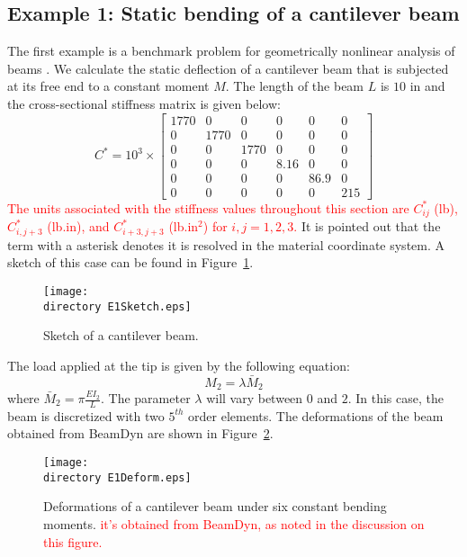 \subsection{Example 1: Static bending of a cantilever beam}

The first example is a benchmark problem for geometrically nonlinear
analysis of beams \cite{Simo1985,Xiao-Zhong:2012}. We calculate the static
deflection of a cantilever beam that is subjected at its free end to
a constant moment $M$.  The length of the beam $L$ is $10$ in and the cross-sectional stiffness 
matrix is given below:
\begin{equation}
    \label{StifE1}
    C^* = 10^3 \times \begin{bmatrix}
	1770 & 0    & 0    & 0    & 0    & 0   \\
	 0    & 1770 & 0    & 0    & 0    & 0   \\
	 0   &   0   & 1770 & 0    & 0    & 0   \\
	 0   &   0   &  0    & 8.16 & 0    & 0   \\
	 0   &   0   &  0    &  0    & 86.9 & 0   \\
	 0   &   0   &  0    &  0    &   0   & 215
\end{bmatrix}
\end{equation}
\textcolor{red}{The units associated with the stiffness values throughout this section are $C_{ij}^*$ (lb), $C_{i,j+3}^*$ (lb.in), and $C_{i+3,j+3}^*$ (lb.in$^2$) for $i,j = 1,2,3$.} It is pointed out that the term with a asterisk denotes it is resolved in the material coordinate system. A sketch of this case can be found in Figure~\ref{E1Sketch}.
\begin{figure}
    \centering
    \texttt{[image: \\directory E1Sketch.eps]}
    \caption{Sketch of a cantilever beam.}
    \label{E1Sketch}
\end{figure} 
The load applied at the tip is given by the following equation:
\begin{equation}
    \label{E1Load}
    M_2 = \lambda \bar{M}_2
\end{equation}
where $\bar{M}_2 = \pi \frac{EI_2}{L}$. The parameter $\lambda$ will vary between $0$ and $2$. In 
this case, the beam is discretized with two $5^{th}$ order elements. The deformations of the beam obtained from BeamDyn are shown in Figure~\ref{E1Deform}.
\begin{figure}
    \centering
    \texttt{[image: \\directory E1Deform.eps]}
    \caption{Deformations of a cantilever beam under six constant
bending moments. \textcolor{red}{it's obtained from BeamDyn, as noted in the discussion on this figure.}}
    \label{E1Deform}
\end{figure}
